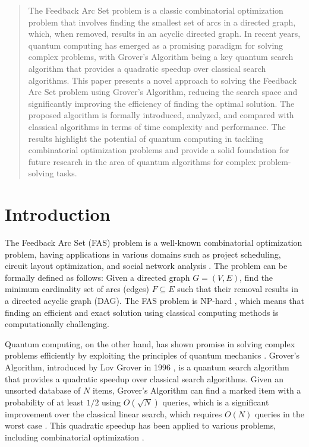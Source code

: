 \begin{abstract}
The Feedback Arc Set problem is a classic combinatorial optimization problem that involves finding the smallest set of arcs in a directed graph, which, when removed, results in an acyclic directed graph. In recent years, quantum computing has emerged as a promising paradigm for solving complex problems, with Grover's Algorithm being a key quantum search algorithm that provides a quadratic speedup over classical search algorithms. This paper presents a novel approach to solving the Feedback Arc Set problem using Grover's Algorithm, reducing the search space and significantly improving the efficiency of finding the optimal solution. The proposed algorithm is formally introduced, analyzed, and compared with classical algorithms in terms of time complexity and performance. The results highlight the potential of quantum computing in tackling combinatorial optimization problems and provide a solid foundation for future research in the area of quantum algorithms for complex problem-solving tasks.

\end{abstract}

\section{Introduction}
\label{sec:introduction}
The Feedback Arc Set (FAS) problem is a well-known combinatorial optimization problem, having applications in various domains such as project scheduling, circuit layout optimization, and social network analysis \cite{fas_applications}. The problem can be formally defined as follows: Given a directed graph $G=(V,E)$, find the minimum cardinality set of arcs (edges) $F \subseteq E$ such that their removal results in a directed acyclic graph (DAG). The FAS problem is NP-hard \cite{fas_np_hard}, which means that finding an efficient and exact solution using classical computing methods is computationally challenging.

Quantum computing, on the other hand, has shown promise in solving complex problems efficiently by exploiting the principles of quantum mechanics \cite{quantum_computing}. Grover's Algorithm, introduced by Lov Grover in 1996 \cite{grover_original}, is a quantum search algorithm that provides a quadratic speedup over classical search algorithms. Given an unsorted database of $N$ items, Grover's Algorithm can find a marked item with a probability of at least $1/2$ using $O(\sqrt{N})$ queries, which is a significant improvement over the classical linear search, which requires $O(N)$ queries in the worst case \cite{grover_bound}. This quadratic speedup has been applied to various problems, including combinatorial optimization \cite{grover_comb_opt}.

